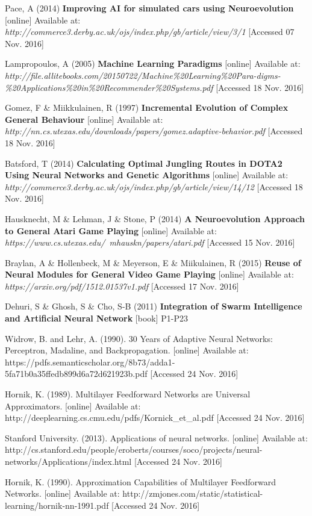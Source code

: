 \documentclass[11pt,a4paper]{article}
\begin{document}
\begin{thebibliography}{10}
	Pace, A
	(2014)
	\textbf{Improving AI for simulated cars using Neuroevolution}
	[online]
	Available at: \textit{http://commerce3.derby.ac.uk/ojs/index.php/gb/article/view/3/1}
	[Accessed 07 Nov. 2016]
	
	Lampropoulos, A
	(2005)
	\textbf{Machine Learning Paradigms}
	[online]
	Available at: \textit{http://file.allitebooks.com/20150722/Machine\%20Learning\%20Para-digms-\%20Applications\%20in\%20Recommender\%20Systems.pdf}
	[Accessed 18 Nov. 2016]
  
	Gomez, F \& Miikkulainen, R
	(1997)
	\textbf{Incremental Evolution of Complex General Behaviour}
	[online]
	Available at: \textit{http://nn.cs.utexas.edu/downloads/papers/gomez.adaptive-behavior.pdf}
	[Accessed 18 Nov. 2016]
	
	Batsford, T
	(2014)
	\textbf{Calculating Optimal Jungling Routes in DOTA2 Using Neural Networks and Genetic Algorithms}
	[online]
	Available at: \textit{http://commerce3.derby.ac.uk/ojs/index.php/gb/article/view/14/12}
	[Accessed 18 Nov. 2016]
	
	Hausknecht, M \& Lehman, J \& Stone, P
	(2014)
	\textbf{A Neuroevolution Approach to General Atari Game Playing}
	[online]
	Available at: \textit{https://www.cs.utexas.edu/~mhauskn/papers/atari.pdf}
	[Accessed 15 Nov. 2016]
	
	Braylan, A \& Hollenbeck, M \& Meyerson, E \& Miikulainen, R
	(2015)
	\textbf{Reuse of Neural Modules for General Video Game Playing}
	[online]
	Available at: \textit{https://arxiv.org/pdf/1512.01537v1.pdf}
	[Accessed 17 Nov. 2016]
	
	Dehuri, S \& Ghosh, S \& Cho, S-B
	(2011)
	\textbf{Integration of Swarm Intelligence and Artificial Neural Network}
	[book]
	P1-P23

	Widrow, B. and Lehr, A.
	(1990).
	30 Years of Adaptive Neural Networks: Perceptron, Madaline, and Backpropagation.
	[online]
	Available at: https://pdfs.semanticscholar.org/8b73/adda1-5fa71b0a35ffedb899d6a72d621923b.pdf
	[Accessed 24 Nov. 2016]
	
	Hornik, K.
	(1989).
	Multilayer Feedforward Networks are Universal Approximators.
	[online]
	Available at: http://deeplearning.cs.cmu.edu/pdfs/Kornick\_et\_al.pdf
	[Accessed 24 Nov. 2016]
	
	Stanford University.
	(2013).
	Applications of neural networks.
	[online]
	Available at: http://cs.stanford.edu/people/eroberts/courses/soco/projects/neural-networks/Applications/index.html
	[Accessed 24 Nov. 2016]
	
	Hornik, K.
	(1990).
	Approximation Capabilities of Multilayer Feedforward Networks.
	[online]
	Available at: http://zmjones.com/static/statistical-learning/hornik-nn-1991.pdf
	[Accessed 24 Nov. 2016]
	
\end{thebibliography}
\end{document}
